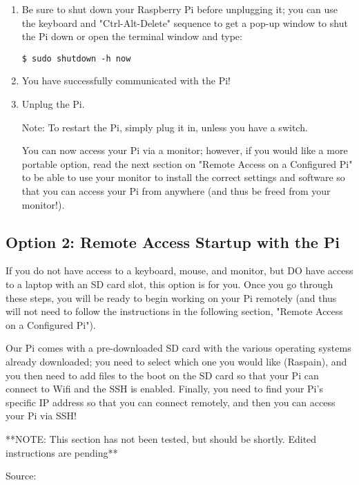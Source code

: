 \documentclass{article}\usepackage[]{graphicx}\usepackage[]{color}
\begin{document}
\begin{enumerate}
\item Be sure to shut down your Raspberry Pi before unplugging it; you can use the keyboard and "Ctrl-Alt-Delete" sequence to get a pop-up window to shut the Pi down or open the terminal window and type:

\begin{lstlisting}
$ sudo shutdown -h now
\end{lstlisting}

\item You have successfully communicated with the Pi!  

\item Unplug the Pi.

Note: To restart the Pi, simply plug it in, unless you have a switch.

You can now access your Pi via a monitor; however, if you would like a more portable option, read the next section on "Remote Access on a Configured Pi" to be able to use your monitor to install the correct settings and software so that you can access your Pi from anywhere (and thus be freed from your monitor!).

\end{enumerate}

\subsection{Option 2: Remote Access Startup with the Pi}

If you do not have access to a keyboard, mouse, and monitor, but DO have access to a laptop with an SD card slot, this option is for you.  Once you go through these steps, you will be ready to begin working on your Pi remotely (and thus will not need to follow the instructions in the following section, "Remote Access on a Configured Pi").

Our Pi comes with a pre-downloaded SD card with the various operating systems already downloaded; you need to select which one you would like (Raspain), and you then need to add files to the boot on the SD card so that your Pi can connect to Wifi and the SSH is enabled.  Finally, you need to find your Pi's specific IP address so that you can connect remotely, and then you can access your Pi via SSH!

**NOTE: This section has not been tested, but should be shortly.  Edited instructions are pending**

Source: %
\end{document}
